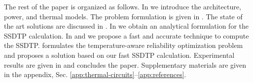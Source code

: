 The rest of the paper is organized as follows. In  we introduce the architecture, power, and thermal models. The problem formulation is given in . The state of the art solutions are discussed in . In  we obtain an analytical formulation for the SSDTP calculation. In  and  we propose a fast and accurate technique to compute the SSDTP.  formulates the temperature-aware reliability optimization problem and proposes a solution based on our fast SSDTP calculation. Experimental results are given in  and  concludes the paper. Supplementary materials are given in the appendix, Sec. \ref{app:thermal-circuits}--\ref{app:references}.
